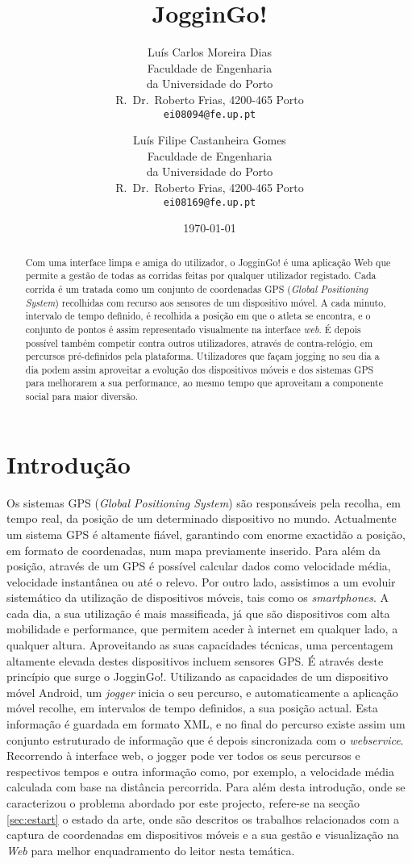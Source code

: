 \documentclass[twocolumn,twoside,10pt,a4paper]{article}
\title{JogginGo! }
\author{Luís Carlos Moreira Dias\\
\small Faculdade de Engenharia\\[-0.8ex]
\small da Universidade do Porto\\[-0.8ex]
\small R.\ Dr.\ Roberto Frias, 4200-465 Porto\\[-0.8ex]
\small \texttt{ei08094@fe.up.pt}\\
\and
Luís Filipe Castanheira Gomes\\
\small Faculdade de Engenharia\\[-0.8ex]
\small da Universidade do Porto\\[-0.8ex]
\small R.\ Dr.\ Roberto Frias, 4200-465 Porto\\[-0.8ex]
\small \texttt{ei08169@fe.up.pt}
}
\date{\today}
\begin{document}
\maketitle
\thispagestyle{plain} 

\begin{abstract}
Com uma interface limpa e amiga do utilizador, o JogginGo! é uma aplicação Web que permite a gestão de todas as corridas feitas por qualquer utilizador registado. Cada corrida é um tratada como um conjunto de coordenadas GPS (\textit{Global Positioning System}) recolhidas com recurso aos sensores de um dispositivo móvel. A cada minuto, intervalo de tempo definido, é recolhida a posição em que o atleta se encontra, e o conjunto de pontos é assim representado visualmente na interface \textit{web}. É depois possível também competir contra outros utilizadores, através de contra-relógio, em percursos pré-definidos pela plataforma. Utilizadores que façam jogging no seu dia a dia podem assim aproveitar a evolução dos dispositivos móveis e dos sistemas GPS para melhorarem a sua performance, ao mesmo tempo que aproveitam a componente social para maior diversão.
\end{abstract}

\section{Introdução}\label{sec:intro}

Os sistemas GPS (\emph{Global Positioning System}) são responsáveis pela recolha, em tempo real, da posição de um determinado dispositivo no mundo. Actualmente um sistema GPS é altamente fiável, garantindo com enorme exactidão a posição, em formato de coordenadas, num mapa previamente inserido. Para além da posição, através de um GPS é possível calcular dados como velocidade média, velocidade instantânea ou até o relevo.
Por outro lado, assistimos a um evoluir sistemático da utilização de dispositivos móveis, tais como os \emph{smartphones}. A cada dia, a sua utilização é mais massificada, já que são dispositivos com alta mobilidade e performance, que permitem aceder à internet em qualquer lado, a qualquer altura. Aproveitando as suas capacidades técnicas, uma percentagem altamente elevada destes dispositivos incluem sensores GPS. 
É através deste princípio que surge o JogginGo!. Utilizando as capacidades de um dispositivo móvel Android, um \emph{jogger} inicia o seu percurso, e automaticamente a aplicação móvel recolhe, em intervalos de tempo definidos, a sua posição actual. Esta informação é guardada em formato XML, e no final do percurso existe assim um conjunto estruturado de informação que é depois sincronizada com o \emph{webservice}. Recorrendo à interface web, o jogger pode ver todos os seus percursos e respectivos tempos e outra informação como, por exemplo, a velocidade média calculada com base na distância percorrida.
Para além desta introdução, onde se caracterizou o problema abordado
por este projecto, refere-se na secção \ref{sec:estart} o
estado da arte, onde são descritos os trabalhos relacionados com a
captura de coordenadas em dispositivos móveis e a sua gestão e visualização na \textit{Web} para melhor enquadramento do leitor nesta temática. 
\end{document}
